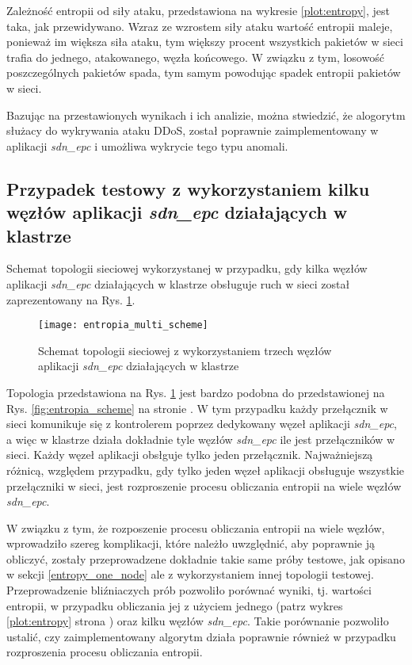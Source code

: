 Zależność entropii od siły ataku, przedstawiona na wykresie \ref{plot:entropy},
jest taka, jak przewidywano. Wzraz ze wzrostem siły ataku wartość entropii
maleje, ponieważ im większa siła ataku, tym większy procent wszystkich pakietów
w sieci trafia do jednego, atakowanego, węzła końcowego. W związku z tym,
losowość poszczególnych pakietów spada, tym samym powodując spadek entropii
pakietów w sieci.

Bazując na przestawionych wynikach i ich analizie, można stwiedzić, że alogorytm
służacy do wykrywania ataku DDoS, został poprawnie zaimplementowany w aplikacji
\textit{sdn\_epc} i umożliwa wykrycie tego typu anomali. 

\subsection{Przypadek testowy z wykorzystaniem kilku węzłów aplikacji
  \textit{sdn\_epc} działających w klastrze} \label{entropy_multi_node}

Schemat topologii sieciowej wykorzystanej w przypadku, gdy kilka węzłów
aplikacji \textit{sdn\_epc} działających w klastrze obsługuje ruch w sieci
został zaprezentowany na Rys. \ref{fig:entropia_multi_scheme}.
\newpage

\begin{figure}[h]
\centering
\texttt{[image: entropia\_multi\_scheme]}
\caption{Schemat topologii sieciowej z wykorzystaniem trzech węzłów aplikacji
  \textit{sdn\_epc} działających w klastrze}
\label{fig:entropia_multi_scheme}
\end{figure}

Topologia przedstawiona na Rys. \ref{fig:entropia_multi_scheme} jest bardzo
podobna do przedstawionej na Rys. \ref{fig:entropia_scheme} na stronie
\pageref{fig:entropia_scheme}. W tym przypadku każdy przełącznik w sieci
komunikuje się z kontrolerem poprzez dedykowany węzeł aplikacji
\textit{sdn\_epc}, a więc w klastrze działa dokładnie tyle węzłów
\textit{sdn\_epc} ile jest przełączników w sieci. Każdy węzeł aplikacji obsłguje
tylko jeden przełącznik. Najważniejszą różnicą, względem przypadku, gdy tylko
jeden węzeł aplikacji obsługuje wszystkie przełączniki w sieci, jest 
rozproszenie procesu obliczania entropii na wiele węzłów \textit{sdn\_epc}.

W związku z tym, że rozposzenie procesu obliczania entropii na wiele węzłów,
wprowadziło szereg komplikacji, które należło uwzględnić, aby poprawnie ją
obliczyć, zostały przeprowadzene dokładnie takie same próby testowe, jak opisano
w sekcji \ref{entropy_one_node} ale z wykorzystaniem innej topologii testowej.
Przeprowadzenie bliźniaczych prób pozwoliło porównać wyniki, tj. wartości
entropii, w przypadku obliczania jej z użyciem jednego (patrz wykres
\ref{plot:entropy} strona \pageref{plot:entropy}) oraz kilku węzłów
\textit{sdn\_epc}. Takie porównanie pozwoliło ustalić, czy zaimplementowany
algorytm działa poprawnie również w przypadku rozproszenia procesu obliczania
entropii.

